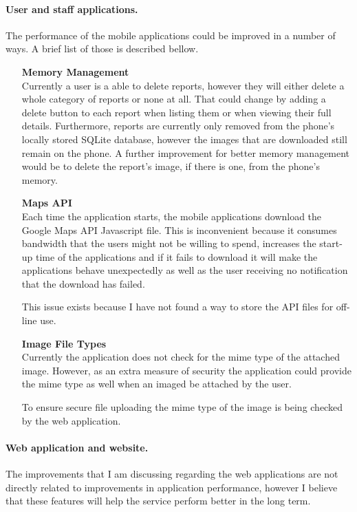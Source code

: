 \documentclass[12pt]{ecsproject}     %
\begin{document}
\paragraph{\large{User and staff applications.}}
The performance of the mobile applications could be improved in a number of ways. A brief list of those is described bellow.
\begin{itemize}
\item[\textbf{Memory Management}]\hfill \\
Currently a user is a able to delete reports, however they will either delete a whole category of reports or none at all. That could change by adding a delete button to each report when listing them or when viewing their full details. Furthermore, reports are currently only removed from the phone's locally stored SQLite database, however the images that are downloaded still remain on the phone. A further improvement for better memory management would be to delete the report's image, if there is one, from the phone's memory.
\item[\textbf{Maps API}]\hfill\\
Each time the application starts, the mobile applications download the Google Maps API Javascript file. This is inconvenient because it consumes bandwidth that the users might not be willing to spend, increases the start-up time of the applications and if it fails to download it will make the applications behave unexpectedly as well as the user receiving no notification that the download has failed.

This issue exists because I have not found a way to store the API files for off-line use.

\item[\textbf{Image File Types}]\hfill \\
Currently the application does not check for the mime type of the attached image. However, as an extra measure of security the application could provide the mime type as well when an imaged be attached by the user.

To ensure secure file uploading the mime type of the image is being checked by the web application.
\end{itemize}

\paragraph{\large{Web application and website.}} The improvements that I am discussing regarding the web applications are not directly related to improvements in application performance, however I believe that these features will help the service perform better in the long term.
\end{document}
